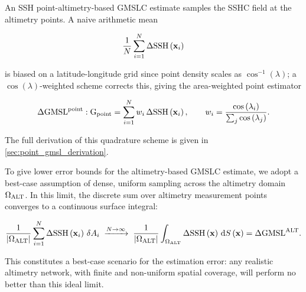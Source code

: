 An SSH point-altimetry-based GMSLC estimate samples the SSHC field at the altimetry points. A naive arithmetic mean

\begin{equation}
    \frac{1}{N}\sum_{i=1}^{N} \Delta \mathrm{SSH}\left(\mathbf{x}_i\right)\label{eq:gmsl_ssh_point_naive}
\end{equation}

is biased on a latitude-longitude grid since point density scales as $\cos^{-1}\left(\lambda\right)$; a $\cos\left(\lambda\right)$-weighted scheme corrects this, giving the area-weighted point estimator

\begin{equation}
    \Delta \mathrm{GMSL}^{\text{point}}: \operatorname{{G}}_{{\text{point}}} = \sum_{i=1}^{N} w_i \, \Delta \mathrm{SSH}\left(\mathbf{x}_i\right), \qquad w_i = \frac{\cos\left(\lambda_i\right)}{\sum_j \cos\left(\lambda_j\right)}. \label{eq:gmsl_ssh_point}
\end{equation}

The full derivation of this quadrature scheme is given in \autoref{sec:point_gmsl_derivation}.


To give lower error bounds for the altimetry-based GMSLC estimate, we adopt a best-case assumption of dense, uniform sampling across the altimetry domain $\Omega_{\mathrm{ALT}}$. In this limit, the discrete sum over altimetry measurement points converges to a continuous surface integral:

\begin{equation}
    \frac{1}{|\Omega_{\mathrm{ALT}}|}\sum_{i=1}^{N} \Delta \mathrm{SSH}\left(\mathbf{x}_i\right)\, \delta A_i
    \;\xrightarrow{N \to \infty}\;
    \frac{1}{|\Omega_{\mathrm{ALT}}|}\int_{\Omega_{\mathrm{ALT}}} \Delta \mathrm{SSH}\left(\mathbf{x}\right)\, \mathrm{d}S\left(\mathbf{x}\right) = \Delta \mathrm{GMSL}^{\mathrm{ALT}}.\label{eq:altimetry_equation}
\end{equation}

This constitutes a best-case scenario for the estimation error: any realistic altimetry network, with finite and non-uniform spatial coverage, will perform no better than this ideal limit.

